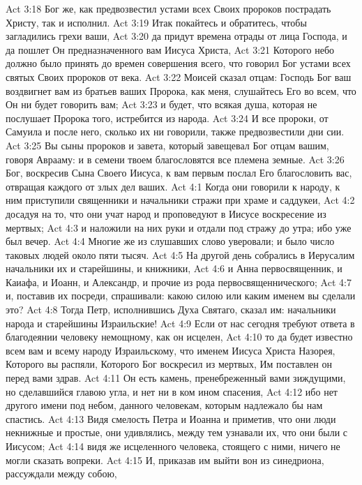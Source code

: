 \vs Act 3:18 Бог же, как предвозвестил устами всех Своих пророков пострадать Христу, так и исполнил.
\vs Act 3:19 Итак покайтесь и обратитесь, чтобы загладились грехи ваши,
\vs Act 3:20 да придут времена отрады от лица Господа, и да пошлет Он предназначенного вам Иисуса Христа,
\vs Act 3:21 Которого небо должно было принять до времен совершения всего, что говорил Бог устами всех святых Своих пророков от века.
\vs Act 3:22 Моисей сказал отцам: Господь Бог ваш воздвигнет вам из братьев ваших Пророка, как меня, слушайтесь Его во всем, что Он ни будет говорить вам;
\vs Act 3:23 и будет, что всякая душа, которая не послушает Пророка того, истребится из народа.
\vs Act 3:24 И все пророки, от Самуила и после него, сколько их ни говорили, также предвозвестили дни сии.
\vs Act 3:25 Вы сыны пророков и завета, который завещевал Бог отцам вашим, говоря Аврааму: и в семени твоем благословятся все племена земные.
\vs Act 3:26 Бог, воскресив Сына Своего Иисуса, к вам первым послал Его благословить вас, отвращая каждого от злых дел ваших.
\vs Act 4:1 Когда они говорили к народу, к ним приступили священники и начальники стражи при храме и саддукеи,
\vs Act 4:2 досадуя на то, что они учат народ и проповедуют в Иисусе воскресение из мертвых;
\vs Act 4:3 и наложили на них руки и отдали  под стражу до утра; ибо уже был вечер.
\vs Act 4:4 Многие же из слушавших слово уверовали; и было число таковых людей около пяти тысяч.
\rsbpar\vs Act 4:5 На другой день собрались в Иерусалим начальники их и старейшины, и книжники,
\vs Act 4:6 и Анна первосвященник, и Каиафа, и Иоанн, и Александр, и прочие из рода первосвященнического;
\vs Act 4:7 и, поставив их посреди, спрашивали: какою силою или каким именем вы сделали это?
\vs Act 4:8 Тогда Петр, исполнившись Духа Святаго, сказал им: начальники народа и старейшины Израильские!
\vs Act 4:9 Если от нас сегодня требуют ответа в благодеянии человеку немощному, как он исцелен,
\vs Act 4:10 то да будет известно всем вам и всему народу Израильскому, что именем Иисуса Христа Назорея, Которого вы распяли, Которого Бог воскресил из мертвых, Им поставлен он перед вами здрав.
\vs Act 4:11 Он есть камень, пренебреженный вами зиждущими, но сделавшийся главою угла, и нет ни в ком ином спасения,
\vs Act 4:12 ибо нет другого имени под небом, данного человекам, которым надлежало бы нам спастись.
\rsbpar\vs Act 4:13 Видя смелость Петра и Иоанна и приметив, что они люди некнижные и простые, они удивлялись, между тем узнавали их, что они были с Иисусом;
\vs Act 4:14 видя же исцеленного человека, стоящего с ними, ничего не могли сказать вопреки.
\vs Act 4:15 И, приказав им выйти вон из синедриона, рассуждали между собою,
